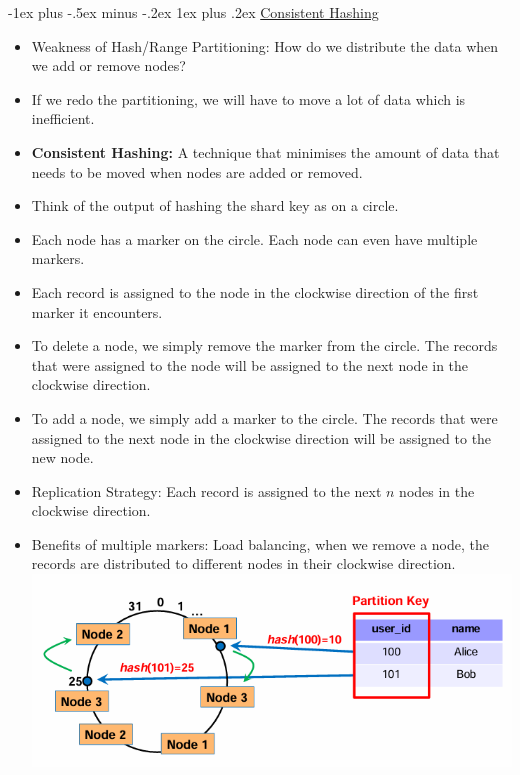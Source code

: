 \documentclass[10pt, landscape]{article}
\makeatletter
\renewcommand{\subsubsection}{\@startsection{subsubsection}{3}{0mm}%
  {-1ex plus -.5ex minus -.2ex}%
  {1ex plus .2ex}%
{\normalfont\small\bfseries}}%
\makeatother
\begin{document}
\begin{multicols*}{4}
  \subsubsection{\underline{Consistent Hashing}}
  \begin{itemize}
    \item Weakness of Hash/Range Partitioning: How do we distribute the data when we add or remove nodes?
    \item If we redo the partitioning, we will have to move a lot of data which is inefficient.
    \item \textbf{Consistent Hashing:} A technique that minimises the amount of data that needs to be moved when nodes are added or removed.
    \item Think of the output of hashing the shard key as on a circle.
    \item Each node has a marker on the circle. Each node can even have multiple markers.
    \item Each record is assigned to the node in the clockwise direction of the first marker it encounters.
    \item To delete a node, we simply remove the marker from the circle. The records that were assigned to the node will be assigned to the next node in the clockwise direction.
    \item To add a node, we simply add a marker to the circle. The records that were assigned to the next node in the clockwise direction will be assigned to the new node.
    \item Replication Strategy: Each record is assigned to the next $n$ nodes in the clockwise direction.
    \item Benefits of multiple markers: Load balancing, when we remove a node, the records are distributed to different nodes in their clockwise direction.
          \includegraphics[width=0.95\linewidth]{consistent_hashing.png}
  \end{itemize}
  


\end{multicols*}
\end{document}
